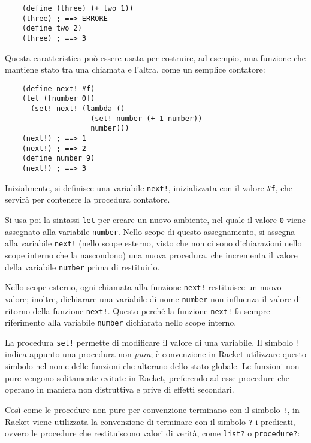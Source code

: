 \begin{lstlisting}
    (define (three) (+ two 1))
    (three) ; ==> ERRORE
    (define two 2)
    (three) ; ==> 3
\end{lstlisting}

Questa caratteristica pu\`o essere usata per costruire, ad esempio, una
funzione che mantiene stato tra una chiamata e l'altra, come un semplice
contatore:

\begin{lstlisting}
    (define next! #f)
    (let ([number 0])
      (set! next! (lambda ()
                    (set! number (+ 1 number))
                    number)))
    (next!) ; ==> 1
    (next!) ; ==> 2
    (define number 9)
    (next!) ; ==> 3
\end{lstlisting}

Inizialmente, si definisce una variabile \lstinline{next!}, inizializzata
con il valore \lstinline{#f}, che servir\`a per contenere la procedura
contatore.

Si usa poi la sintassi \lstinline{let} per creare un nuovo ambiente,
nel quale il valore \lstinline{0} viene assegnato alla variabile
\lstinline{number}. Nello scope di questo assegnamento, si assegna
alla variabile \lstinline{next!} (nello scope esterno, visto che non ci
sono dichiarazioni nello scope interno che la nascondono) una nuova
procedura, che incrementa il valore della variabile \lstinline{number}
prima di restituirlo.

Nello scope esterno, ogni chiamata alla funzione \lstinline{next!}
restituisce un nuovo valore; inoltre, dichiarare una variabile di nome
\lstinline{number} non influenza il valore di ritorno della
funzione \lstinline{next!}. Questo perch\'e la funzione \lstinline{next!}
fa sempre riferimento alla variabile \lstinline{number} dichiarata
nello scope interno.

La procedura \lstinline{set!} permette di modificare il valore di una
variabile. Il simbolo \lstinline{!} indica appunto una procedura non
\emph{pura}; \`e convenzione in Racket utilizzare questo simbolo nel
nome delle funzioni che alterano dello stato globale. Le funzioni non
pure vengono solitamente evitate in Racket, preferendo ad esse procedure
che operano in maniera non distruttiva e prive di effetti secondari.

Cos\`i come le procedure non pure per convenzione terminano con il
simbolo \lstinline{!}, in Racket viene utilizzata la convenzione di
terminare con il simbolo \lstinline{?} i predicati, ovvero le procedure
che restituiscono valori di verit\`a, come \lstinline{list?} o
\lstinline{procedure?}:

